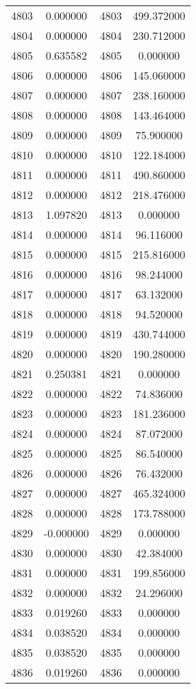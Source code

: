 \documentclass[12pt]{article}
\begin{document}
\begin{longtable}{@{}cccc@{}}
4803 & 0.000000 & 4803 & 499.372000 \\
4804 & 0.000000 & 4804 & 230.712000 \\
4805 & 0.635582 & 4805 & 0.000000 \\
4806 & 0.000000 & 4806 & 145.060000 \\
4807 & 0.000000 & 4807 & 238.160000 \\
4808 & 0.000000 & 4808 & 143.464000 \\
4809 & 0.000000 & 4809 & 75.900000 \\
4810 & 0.000000 & 4810 & 122.184000 \\
4811 & 0.000000 & 4811 & 490.860000 \\
4812 & 0.000000 & 4812 & 218.476000 \\
4813 & 1.097820 & 4813 & 0.000000 \\
4814 & 0.000000 & 4814 & 96.116000 \\
4815 & 0.000000 & 4815 & 215.816000 \\
4816 & 0.000000 & 4816 & 98.244000 \\
4817 & 0.000000 & 4817 & 63.132000 \\
4818 & 0.000000 & 4818 & 94.520000 \\
4819 & 0.000000 & 4819 & 430.744000 \\
4820 & 0.000000 & 4820 & 190.280000 \\
4821 & 0.250381 & 4821 & 0.000000 \\
4822 & 0.000000 & 4822 & 74.836000 \\
4823 & 0.000000 & 4823 & 181.236000 \\
4824 & 0.000000 & 4824 & 87.072000 \\
4825 & 0.000000 & 4825 & 86.540000 \\
4826 & 0.000000 & 4826 & 76.432000 \\
4827 & 0.000000 & 4827 & 465.324000 \\
4828 & 0.000000 & 4828 & 173.788000 \\
4829 & -0.000000 & 4829 & 0.000000 \\
4830 & 0.000000 & 4830 & 42.384000 \\
4831 & 0.000000 & 4831 & 199.856000 \\
4832 & 0.000000 & 4832 & 24.296000 \\
4833 & 0.019260 & 4833 & 0.000000 \\
4834 & 0.038520 & 4834 & 0.000000 \\
4835 & 0.038520 & 4835 & 0.000000 \\
4836 & 0.019260 & 4836 & 0.000000 \\

\end{longtable}
\end{document}
